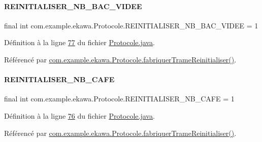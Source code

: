 \paragraph{\texorpdfstring{R\+E\+I\+N\+I\+T\+I\+A\+L\+I\+S\+E\+R\+\_\+\+N\+B\+\_\+\+B\+A\+C\+\_\+\+V\+I\+D\+EE}{REINITIALISER\_NB\_BAC\_VIDEE}}
{\footnotesize\ttfamily final int com.\+example.\+ekawa.\+Protocole.\+R\+E\+I\+N\+I\+T\+I\+A\+L\+I\+S\+E\+R\+\_\+\+N\+B\+\_\+\+B\+A\+C\+\_\+\+V\+I\+D\+EE = 1\hspace{0.3cm}{\ttfamily [static]}}



Définition à la ligne \hyperlink{_protocole_8java_source_l00077}{77} du fichier \hyperlink{_protocole_8java_source}{Protocole.\+java}.



Référencé par \hyperlink{_protocole_8java_source_l00126}{com.\+example.\+ekawa.\+Protocole.\+fabriquer\+Trame\+Reinitialiser()}.

\mbox{\label{classcom_1_1example_1_1ekawa_1_1_protocole_ab93072e61ae443c91f07700a3f754a1c}} 
\paragraph{\texorpdfstring{R\+E\+I\+N\+I\+T\+I\+A\+L\+I\+S\+E\+R\+\_\+\+N\+B\+\_\+\+C\+A\+FE}{REINITIALISER\_NB\_CAFE}}
{\footnotesize\ttfamily final int com.\+example.\+ekawa.\+Protocole.\+R\+E\+I\+N\+I\+T\+I\+A\+L\+I\+S\+E\+R\+\_\+\+N\+B\+\_\+\+C\+A\+FE = 1\hspace{0.3cm}{\ttfamily [static]}}



Définition à la ligne \hyperlink{_protocole_8java_source_l00076}{76} du fichier \hyperlink{_protocole_8java_source}{Protocole.\+java}.



Référencé par \hyperlink{_protocole_8java_source_l00126}{com.\+example.\+ekawa.\+Protocole.\+fabriquer\+Trame\+Reinitialiser()}.

